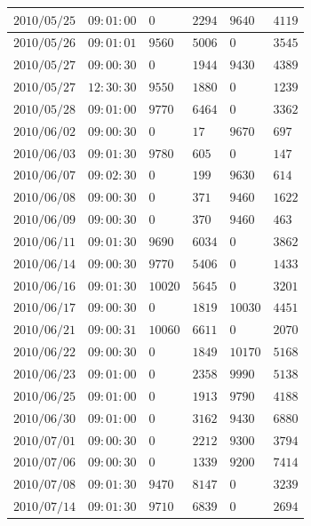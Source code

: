 \documentclass[a4j,papersize,disablejfam,slide,14pt]{jsarticle}
\begin{document}
\begin{description}
\begin{center}
\begin{longtable}{|l|l|l|l|l|l|}
					$2010/05/25$ & $09:01:00$  & $0$ & $2294$ & $9640$ & $4119$ \\ \hline
					$2010/05/26$ & $09:01:01$  & $9560$ & $5006$ & $0$ & $3545$ \\ \hline
					$2010/05/27$ & $09:00:30$  & $0$ & $1944$ & $9430$ & $4389$ \\ \hline
					$2010/05/27$ & $12:30:30$  & $9550$ & $1880$ & $0$ & $1239$ \\ \hline
					$2010/05/28$ & $09:01:00$  & $9770$ & $6464$ & $0$ & $3362$ \\ \hline
					$2010/06/02$ & $09:00:30$  & $0$ & $17$ & $9670$ & $697$ \\ \hline
					$2010/06/03$ & $09:01:30$  & $9780$ & $605$ & $0$ & $147$ \\ \hline
					$2010/06/07$ & $09:02:30$  & $0$ & $199$ & $9630$ & $614$ \\ \hline
					$2010/06/08$ & $09:00:30$  & $0$ & $371$ & $9460$ & $1622$ \\ \hline
					$2010/06/09$ & $09:00:30$  & $0$ & $370$ & $9460$ & $463$ \\ \hline
					$2010/06/11$ & $09:01:30$  & $9690$ & $6034$ & $0$ & $3862$ \\ \hline
					$2010/06/14$ & $09:00:30$  & $9770$ & $5406$ & $0$ & $1433$ \\ \hline
					$2010/06/16$ & $09:01:30$  & $10020$ & $5645$ & $0$ & $3201$ \\ \hline
					$2010/06/17$ & $09:00:30$  & $0$ & $1819$ & $10030$ & $4451$ \\ \hline
					$2010/06/21$ & $09:00:31$  & $10060$ & $6611$ & $0$ & $2070$ \\ \hline
					$2010/06/22$ & $09:00:30$  & $0$ & $1849$ & $10170$ & $5168$ \\ \hline
					$2010/06/23$ & $09:01:00$  & $0$ & $2358$ & $9990$ & $5138$ \\ \hline
					$2010/06/25$ & $09:01:00$  & $0$ & $1913$ & $9790$ & $4188$ \\ \hline
					$2010/06/30$ & $09:01:00$  & $0$ & $3162$ & $9430$ & $6880$ \\ \hline
					$2010/07/01$ & $09:00:30$  & $0$ & $2212$ & $9300$ & $3794$ \\ \hline
					$2010/07/06$ & $09:00:30$  & $0$ & $1339$ & $9200$ & $7414$ \\ \hline
					$2010/07/08$ & $09:01:30$  & $9470$ & $8147$ & $0$ & $3239$ \\ \hline
					$2010/07/14$ & $09:01:30$  & $9710$ & $6839$ & $0$ & $2694$ \\ \hline

\end{longtable}
\end{center}
\end{description}
\end{document}
